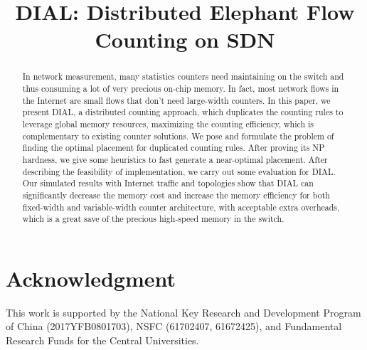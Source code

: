 \documentclass[conference]{IEEEtran}
\begin{document}
\title{DIAL: Distributed Elephant Flow Counting on SDN}

\author{
}

\maketitle

\begin{abstract}
In network measurement, many statistics counters need maintaining on the switch and thus consuming a lot of very precious on-chip memory.
In fact, most network flows in the Internet are small flows that don't need large-width counters.
In this paper, we present DIAL, a distributed counting approach, which duplicates the counting rules to leverage global memory resources, maximizing the counting efficiency, which is complementary to existing counter solutions.
We pose and formulate the problem of finding the optimal placement for duplicated counting rules.
After proving its NP hardness, we give some heuristics to fast generate a near-optimal placement.
After describing the feasibility of implementation, we carry out some evaluation for DIAL.
Our simulated results with Internet traffic and topologies show that DIAL can significantly decrease the memory cost and increase the memory efficiency for both fixed-width and variable-width counter architecture, with acceptable extra overheads, which is a great save of the precious high-speed memory in the switch.
\end{abstract}

\IEEEpeerreviewmaketitle









\section*{Acknowledgment}
This work is supported by the National Key Research and Development Program of China (2017YFB0801703), NSFC (61702407, 61672425), and Fundamental Research Funds for the Central Universities.



\end{document}
